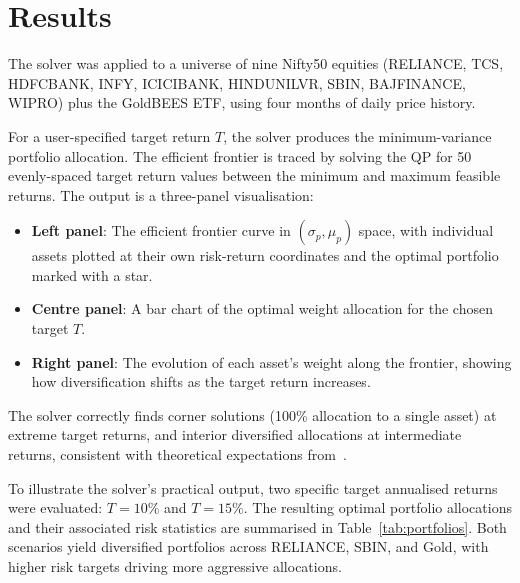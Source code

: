 \documentclass[conference]{IEEEtran}
\begin{document}
\section{Results}

The solver was applied to a universe of nine Nifty50 equities
(RELIANCE, TCS, HDFCBANK, INFY, ICICIBANK, HINDUNILVR, SBIN, BAJFINANCE,
WIPRO) plus the GoldBEES ETF, using four months of daily price history.

For a user-specified target return $T$, the solver produces the
minimum-variance portfolio allocation. The efficient frontier is traced by
solving the QP for 50 evenly-spaced target return values between the minimum
and maximum feasible returns. The output is a three-panel visualisation:

\begin{itemize}
    \item \textbf{Left panel}: The efficient frontier curve in
          $(\sigma_p, \mu_p)$ space, with individual assets plotted at their
          own risk-return coordinates and the optimal portfolio marked with a
          star.
    \item \textbf{Centre panel}: A bar chart of the optimal weight allocation
          for the chosen target $T$.
    \item \textbf{Right panel}: The evolution of each asset's weight along the
          frontier, showing how diversification shifts as the target return
          increases.
\end{itemize}

The solver correctly finds corner solutions (100\% allocation to a single
asset) at extreme target returns, and interior diversified allocations at
intermediate returns, consistent with theoretical expectations
from~\cite{markowitz1952}.

To illustrate the solver's practical output, two specific target annualised
returns were evaluated: $T = 10\%$ and $T = 15\%$. The resulting optimal
portfolio allocations and their associated risk statistics are summarised in
Table~\ref{tab:portfolios}. Both scenarios yield diversified portfolios across
RELIANCE, SBIN, and Gold, with higher risk targets driving more aggressive
allocations.
\end{document}
